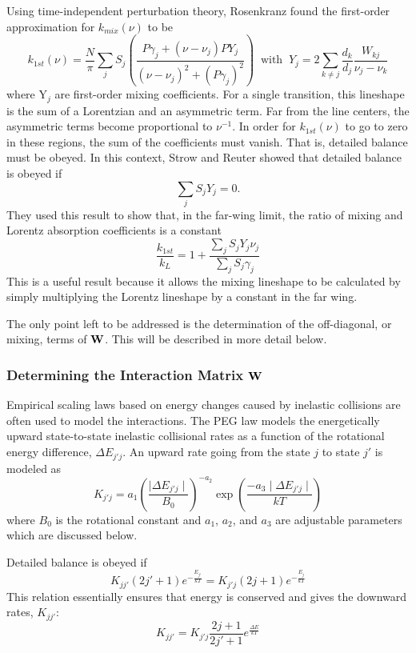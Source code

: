 \documentclass[11pt]{article}
\begin{document}
Using time-independent perturbation theory, Rosenkranz found the first-order 
approximation for $k_{mix}(\nu)$ to be 
\[
k_{1st}(\nu)=\frac{N}{\pi}\sum_{j} S_{j}
\left(\frac{P \gamma_{j}+ 
(\nu-\nu_{j})PY_{j}}{(\nu-\nu_{j})^{2}+(P\gamma_{j})^{2}}\right)
\; \; \mbox{with} \; \; 
Y_j=2\sum_{k\neq j}\frac{d_k}{d_j}\frac{W_{kj}}{\nu_j-\nu_k}
\]
where 
$\mbox{Y}_j$ are first-order mixing coefficients.  For a single transition, 
this lineshape is the sum of a Lorentzian and an asymmetric term.  Far from
the line centers, the asymmetric terms become proportional to $\nu^{-1}$.  
In order for $k_{1st}(\nu)$ to go to zero in these regions, the sum of the
coefficients must vanish.  That is, detailed balance must be obeyed.  In 
this context, Strow and Reuter\cite{str:88*1} showed that detailed balance 
is obeyed if
\[
 \sum_{j} S_{j} Y_{j}=0.
\]
They used this result to show that, in the far-wing limit, the 
ratio of mixing and Lorentz absorption coefficients is a
constant\cite{str:88*1}
\[
 \frac{k_{1st}}{k_{L}}= 1 + \frac{\sum_{j}S_{j}Y_{j}\nu_{j}}
{\sum_{j}S_{j}\gamma_{j}}
\]
This is a useful result because it allows the mixing lineshape to be
calculated by simply multiplying the Lorentz lineshape by a constant in
the far wing.

The only point left to be addressed is the determination of the 
off-diagonal, or mixing, terms of ${\bf W}$. This will be described in 
more detail below.

\subsubsection{Determining the Interaction Matrix ${\bf W}$}

Empirical scaling laws based on energy changes caused by inelastic 
collisions are often used to model the interactions.  The PEG law models the
energetically upward state-to-state inelastic collisional rates as a 
function of the rotational energy difference, $\Delta E_{j'j}$.  An upward 
rate going from the state $j$ to state $j'$ is modeled as 
\[
 K_{j'j}=a_{1}\left(\frac{\mid\Delta E_{j'j}\mid}{B_{0}}\right)^{-a_{2}}
\exp\left(\frac{-a_{3}\mid\Delta E_{j'j}\mid}{kT}\right)
\]
where $B_{0}$ is the rotational constant and $a_{1}$, $a_{2}$, and $a_{3}$
are adjustable parameters which are discussed below. 

Detailed balance is obeyed if
\[
K_{jj'}(2j'+1)e^{-\frac{E_{j'}}{kT}}=K_{j'j}(2j+1)e^{-\frac{E_{j}}{kT}}
\]
This relation essentially ensures that energy is conserved and gives the
downward rates, $K_{jj'}$:
\[
K_{jj'}=K_{j'j} \frac{2j+1}{2j'+1} e^{\frac{\Delta E}{kT}}
\]
\end{document}
